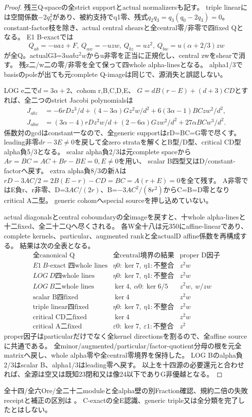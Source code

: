 \documentclass[a4paper,11pt]{ltjsarticle}
\theoremstyle{definition}
\begin{document}
\begin{proof}
残三Q-spaceの全strict supportとactual normalizersも記す。
triple linearには空間係数$-2q_1^2$があり、被約支持でq1零、残式$q_2q_3=q_3(q_0-2q_3)=0$。
constant-factor枝を除き、actual central shearsと全central零/非零で四fixed Qとなる。
E1 B-exactでは
\[
 Q_{ab}=-uaz+F,\ Q_{aw}=-uzw,\ Q_{bz}=uz^2,\
 Q_{bw}=u(\alpha+2/3)zw
\]
が全Q。actualG3=$3u ab z^2w$からu非零を正当に正規化し、central zwをshearで消す。
残z二/w二の零/非零を全て保って四whole alpha-linesとなる。
alpha1/3でbasisのpoleが出ても元complete Q-imageは同じで、源消失と誤認しない。

LOG e二で$d=3\alpha+2$、cohom r,B,C,D,E、
$G=dB(r-E)+(d+3)CD$とすれば、全二つのstrict Jacobi polynomialsは
\[
\begin{split}
 J_{abz}&=-6rDz^3/d+(4-3\alpha)Gz^2w/d^2+6(3\alpha-1)BCzw^2/d^2,\\
 J_{abw}&=(3\alpha-4)rDz^2w/d+(2-6\alpha)Gzw^2/d^2+27\alpha BCw^3/d^2.
\end{split}
\]
係数対のgcdはconstant一なので、全generic supportはrD=BC=G零で尽くす。
leading非零$dr-3E\ne0$を戻して全zero strataを解くとB型/D型、critical CD型alpha負5/3となる。
scalar alpha負2/3は元complete spaceから$Ar=BC=AC+Br-BE=0,E\ne0$を用い、
scalar B四型又はD/constant-factorへ戻す。
extra alpha負8/3の新Aは
$rD-3AC/2=2B(E-r)-CD=BC=A(r+E)=0$を全て残す。
A非零ではE負r、r非零、D=$3AC/(2r)$、B=$-3AC^2/(8r^2)$からC=B=D零となりcritical A二型。
generic cohomへspecial sourceを押し込めていない。

actual diagonalsとcentral coboundaryの全imageを戻すと、十whole alpha-linesと十二fixed、全二十二Qへ尽くされる。
各W全十八は元350にaffine-linearであり、complete kernels、particular、augmented rankと全actualD affine係数を再構成する。
結果は次の全表となる。
\[
\begin{array}{c|c|c}
 \text{全canonical Q}&\text{全central境界の結果}&\text{proper D因子}\\\hline
 E1\ B\text{-exact 四whole lines}&\eta0:\ker7,\ \eta1:\text{不整合}&z^2w\\
 LOG\ D\text{四whole lines}&\eta0:\ker7,\ \eta1:\text{不整合}&z^2w\\
 LOG\ B\text{二whole lines}&\ker4,\ \alpha0:\ker6/5&z^2w,\ w/zw\\
 \text{scalar B四fixed}&\ker4&z^2w\\
 \text{triple linear四fixed}&\eta0:\ker7,\ \eta1:\text{不整合}&z^2w\\
 \text{critical CD二fixed}&\ker4&z^2w\\
 \text{critical A二fixed}&\varepsilon0:\ker7,\ \varepsilon1:\text{不整合}&z^2
\end{array}
\]
proper因子はparticularだけでなく全kernel directionsを割るので、全affine sourceに共通である。
全minor/augmented/particular/factor-quotient分母の根を元全matrixへ戻し、whole alpha零や全central零境界を保持した。
LOG Bのalpha負2/3はscalar B、alpha1/3はleading零へ戻す。
以上を十四源の必要還元と合わせれば、全源は空又は既知23閉和又は像24以下でありG非優越となる。
\end{proof}
全十四/全六Ore/全二十二moduleと全alpha壁の別Fraction確認、規約二倍の失敗receiptと補正の区別は
。
C-exactの全E認識、generic triple又は全分類を完了したとはしない。
\end{document}
